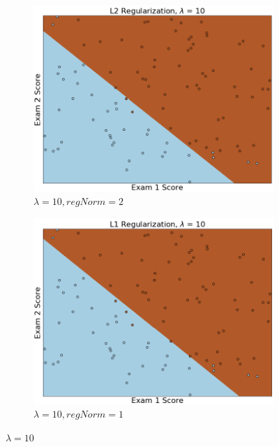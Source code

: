 \documentclass{article}
\begin{document}
\begin{enumerate}
    	\begin{figure}[h!]
     	\centering
     	\begin{subfigure}[b]{0.44\textwidth}
         	\centering
         	\includegraphics[width=\textwidth]
         	{Problem_1_3/fig_L2_5.png}
         	\caption{$\lambda = 10, regNorm = 2$}
         	\label{fig:L2_5}
     	\end{subfigure}
     	\hfill
     	\begin{subfigure}[b]{0.44\textwidth}
         	\centering
         	\includegraphics[width=\textwidth]
         	{Problem_1_3/fig_L1_5.png}
         	\caption{$\lambda = 10, regNorm = 1$}
         	\label{fig:L1_5}
     	\end{subfigure}
     	\caption{$\lambda=10$}
		\end{figure}
		
    	\end{enumerate}
\end{document}
